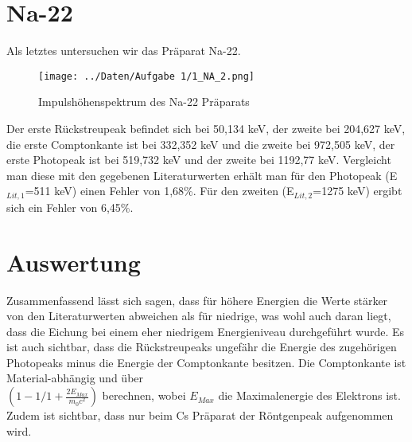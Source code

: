\section{Na-22}
Als letztes untersuchen wir das Präparat Na-22.
\begin{figure}
	\centering
	\texttt{[image: ../Daten/Aufgabe 1/1\_NA\_2.png]}
	\caption{Impulshöhenspektrum des Na-22 Präparats}
\end{figure}
Der erste Rückstreupeak befindet sich bei 50,134 keV, der zweite bei 204,627 keV, die erste Comptonkante ist bei 332,352 keV und die zweite bei 972,505 keV, der erste Photopeak ist bei 519,732 keV und der zweite bei 1192,77 keV. Vergleicht man diese mit den gegebenen Literaturwerten erhält man für den Photopeak (E$ _{Lit,1} $=511 keV) einen Fehler von 1,68\%. Für den zweiten (E$ _{Lit,2} $=1275 keV) ergibt sich ein Fehler von 6,45\%. 
\section{Auswertung}
Zusammenfassend lässt sich sagen, dass für höhere Energien die Werte stärker von den Literaturwerten abweichen als für niedrige, was wohl auch daran liegt, dass die Eichung bei einem eher niedrigem Energieniveau durchgeführt wurde. Es ist auch sichtbar, dass die Rückstreupeaks ungefähr die Energie des zugehörigen Photopeaks minus die Energie der Comptonkante besitzen. Die Comptonkante ist Material-abhängig und über\\ $ ( 1-1/1+\frac{2E_{Max}}{m_0c^2})  $ berechnen, wobei $ E_{Max} $ die Maximalenergie des Elektrons ist. Zudem ist sichtbar, dass nur beim Cs Präparat der Röntgenpeak aufgenommen wird.